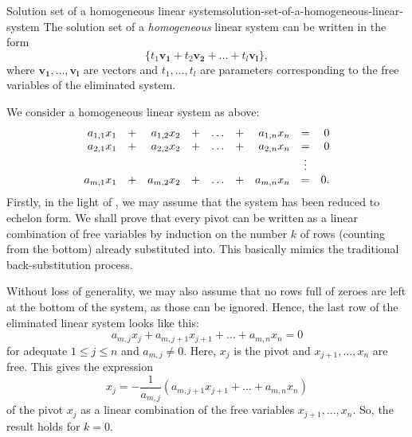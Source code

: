 \begin{proposition}{Solution set of a homogeneous linear system}{solution-set-of-a-homogeneous-linear-system}
 The solution set of a \emph{homogeneous} linear system can be written in the
 form
 \[
  \{t_1 \mathbf{v_1} + t_2 \mathbf{v_2} + \ldots + t_l\mathbf{v_l}\},
 \]
 where $\mathbf{v_1},\ldots,\mathbf{v_l}$ are vectors and $t_1,\ldots,t_l$ are
 parameters corresponding to the free variables of the eliminated system.
\end{proposition}
\begin{propproof}
 We consider a homogeneous linear system as above:
\begin{equation}
 \label{eq:hom-lin-sys}
 \begin{array}{r c r c c c r c r}
  a_{1,1}x_1 & + & a_{1,2}x_2 & + & \ldots & + & a_{1,n}x_n & = & 0\\
  a_{2,1}x_1 & + & a_{2,2}x_2 & + & \ldots & + & a_{2,n}x_n & = & 0\\
            &   &           &   &        &   &           & \vdots & \\
  a_{m,1}x_1 & + & a_{m,2}x_2 & + & \ldots & + & a_{m,n}x_n & = & 0.
 \end{array}
\end{equation}
 Firstly, in the light of , we may assume that
 the system has been reduced to echelon form. We shall prove that every pivot
 can be written as a linear combination of free variables by induction on the
 number $k$ of rows (counting from the bottom) already substituted into. This
 basically mimics the traditional back-substitution process.

 Without loss of generality, we may also assume that no rows full of zeroes are
 left at the bottom of the system, as those can be ignored. Hence, the last row
 of the eliminated linear system looks like this:
 \[
  a_{m,j}x_j + a_{m,j+1}x_{j+1} + \ldots + a_{m,n}x_n = 0
 \]
 for adequate $1 \leq j \leq n$ and $a_{m,j} \neq 0$. Here, $x_j$ is the pivot
 and $x_{j+1},\ldots,x_n$ are free. This gives the expression
 \[
  x_j = -\frac{1}{a_{m,j}}(a_{m,j+1}x_{j+1} + \ldots + a_{m,n}x_n)
 \]
 of the pivot $x_j$ as a linear combination of the free variables
 $x_{j+1},\ldots,x_n$. So, the result holds for $k = 0$.


\end{propproof}
